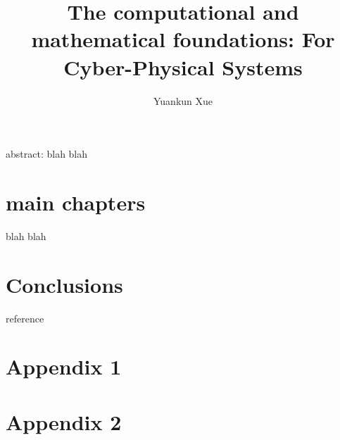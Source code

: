 \documentclass{USC-proposal}
\title{The computational and mathematical foundations:  \break
 For Cyber-Physical Systems}
\author{Yuankun Xue}
\numberwithin{equation}{chapter}
\begin{document}

\maketitle




\tableofcontents  %
\listoftables     %
\listoffigures    %

abstract: blah blah


\mainmatter


\chapter{main chapters}
blah blah
\chapter{Conclusions}


{reference}

\appendix
\chapter{Appendix 1}
\chapter{Appendix 2}
\end{document}
